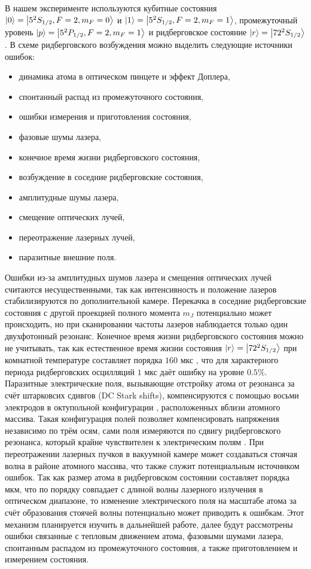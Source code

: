 В нашем эксперименте используются кубитные состояния $\left| 0 \right\rangle = \left| 5^2S_{1/2},F=2,m_F=0 \right\rangle$ и $\left| 1 \right\rangle = \left| 5^2S_{1/2},F=2,m_F=1 \right\rangle$, промежуточный уровень $\left| p \right\rangle = \left| 5^2P_{1/2},F=2,m_F=1 \right\rangle$ и ридберговское состояние $\left| r \right\rangle=\left| {72}^2S_{1/2} \right\rangle$. В схеме ридберговского возбуждения можно выделить следующие источники ошибок:  


\begin{itemize}
	\item динамика атома в оптическом пинцете и эффект Доплера,
	\item спонтанный распад из промежуточного состояния, 
	\item ошибки измерения и приготовления состояния,
	\item фазовые шумы лазера, 
	\item конечное время жизни ридберговского состояния,
	\item возбуждение в соседние ридберговские состояния,
	\item амплитудные шумы лазера,
	\item смещение оптических лучей, 
	\item переотражение лазерных лучей, 
	\item паразитные внешние поля.
\end{itemize}

Ошибки из-за амплитудных шумов лазера и смещения оптических лучей считаются несущественными, так как интенсивность и положение лазеров стабилизируются по дополнительной камере. Перекачка в соседние ридберговские состояния с другой проекцией полного момента $m_J$ \cite{Evered:2023aa} потенциально может происходить, но при сканировании частоты лазеров наблюдается только один двухфотонный резонанс. Конечное время жизни ридберговского состояния можно не учитывать, так как естественное время жизни состояния $\left| r \right\rangle = \left| 72^{2}S_{1/2} \right\rangle$ при комнатной температуре составляет порядка $160\text{ мкс}$ \cite{Ryabtsev_BBR}, что для характерного периода ридберговских осцилляций $1\text{ мкс}$ даёт ошибку на уровне $0.5 \%$. Паразитные электрические поля, вызывающие отстройку атома от резонанса за счёт штарковсих сдивгов (DC Stark shifts), компенсируются с помощью восьми электродов в октупольной конфигурации \cite{Beguin}, расположенных вблизи атомного массива. Такая конфигурация полей позволяет компенсировать напряжения независимо по трём осям, сами поля измеряются по сдвигу ридберговского резонанса, который крайне чувствителен к электрическим полям \cite{Beguin}. При переотражении лазерных пучков в вакуумной камере может создаваться стоячая волна в районе атомного массива, что также служит потенциальным источником ошибок. Так как размер атома в ридберговском состоянии составляет порядка мкм, что по порядку совпадает с длиной волны лазерного излучения в оптическом диапазоне, то изменение электрического поля на масштабе атома за счёт образования стоячей волны потенциально может приводить к ошибкам. Этот механизм  планируется изучить в дальнейшей работе, далее будут рассмотрены  ошибки связанные с тепловым движением атома, фазовыми шумами лазера, спонтанным распадом из промежуточного состояния, а также приготовлением и измерением состояния. 


